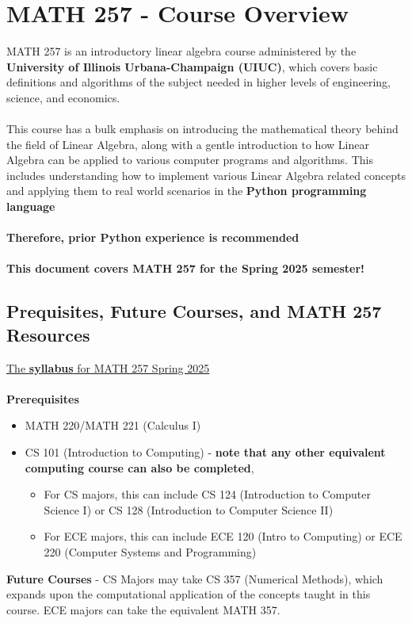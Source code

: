 \section{MATH 257 - Course Overview}
MATH 257 is an introductory linear algebra course administered by the \textbf{University of Illinois Urbana-Champaign (UIUC)}, which covers basic definitions and algorithms of the subject needed in higher levels of engineering, science, and economics. \\\\
This course has a bulk emphasis on introducing the mathematical theory behind the field 
of Linear Algebra, along with a gentle introduction to how Linear Algebra can be applied to various computer programs and algorithms. This includes understanding 
how to implement various Linear Algebra related concepts 
and applying them to real world scenarios in the \textbf{Python programming language} \\\\
\textbf{Therefore, prior Python experience is recommended} \\\\
\textbf{This document covers MATH 257 for the Spring 2025 semester!}

\subsection{Prequisites, Future Courses, and MATH 257 Resources}
\href{https://lti.learn.illinois.edu/pluginfile.php/3027342/mod_resource/content/43/s25-math257--Syllabus.pdf}{The \textbf{syllabus} for MATH 257 Spring 2025} \\\\
\textbf{Prerequisites}
\begin{itemize}
  \item MATH 220/MATH 221 (Calculus I)
  \item CS 101 (Introduction to Computing) - \textbf{note that any other equivalent 
    computing course can also be completed},
  \begin{itemize}
    \item For CS majors, this can include CS 124 (Introduction to Computer Science I) or CS 128 (Introduction to Computer Science II)
    \item For ECE majors, this can include ECE 120 (Intro to Computing) or ECE 220 (Computer Systems and Programming)
  \end{itemize}
\end{itemize}
\textbf{Future Courses} - CS Majors may take CS 357 (Numerical Methods), which expands
upon the computational application of the concepts taught in this course. ECE majors 
can take the equivalent MATH 357.

